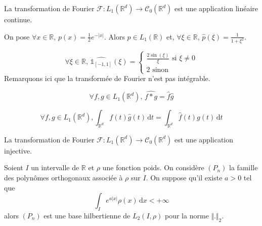	\begin{corollary}
		La transformation de Fourier $\mathcal{F} : L_1(\mathbb{R}^d) \rightarrow \mathcal{C}_0(\mathbb{R}^d)$ est une application linéaire continue.
	\end{corollary}

	\begin{example}
		On pose $\forall x \in \mathbb{R}$, $p(x) = \frac{1}{2} e^{-|x|}$. Alors $p \in L_1(\mathbb{R})$ et, $\forall \xi \in \mathbb{R}$, $\widehat{p}(\xi) = \frac{1}{1+\xi^2}$.
	\end{example}

	\begin{example}
		\[
		\forall \xi \in \mathbb{R}, \, \widehat{\mathbb{1}_{[-1,1]}}(\xi) =
		\begin{cases}
			\frac{2 \sin(\xi)}{\xi} \text{ si } \xi \neq 0 \\
			2 \text{ sinon}
		\end{cases}
		\]
		Remarquons ici que la transformée de Fourier n'est pas intégrable.
	\end{example}


	\begin{proposition}
		\[ \forall f, g \in L_1(\mathbb{R}^d), \, \widehat{f * g} = \widehat{f} \widehat{g} \]
	\end{proposition}

	\begin{theorem}
		\[ \forall f, g \in L_1(\mathbb{R}^d), \int_{\mathbb{R}^d} f(t) \widehat{g}(t) \, \mathrm{d}t = \int_{\mathbb{R}^d} \widehat{f}(t) g(t) \, \mathrm{d}t \]
	\end{theorem}

	\begin{theorem}
		La transformation de Fourier $\mathcal{F} : L_1(\mathbb{R}^d) \rightarrow \mathcal{C}_0(\mathbb{R}^d)$ est une application injective.
	\end{theorem}


	\begin{application}
		Soient $I$ un intervalle de $\mathbb{R}$ et $\rho$ une fonction poids. On considère $(P_n)$ la famille des polynômes orthogonaux associée à $\rho$ sur $I$. On suppose qu'il existe $a > 0$ tel que
		\[ \int_I e^{a \vert x \vert} \rho(x) \, \mathrm{d}x < +\infty \]
		alors $(P_n)$ est une base hilbertienne de $L_2(I, \rho)$ pour la norme $\Vert . \Vert_2$.
	\end{application}

